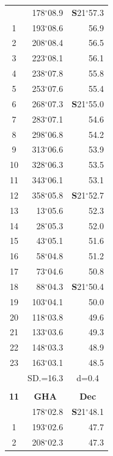 \documentclass[10pt, a4paper]{report}
\begin{document}
\begin{scriptsize}
\begin{tabular*}{0.2\textwidth}[t]{@{\extracolsep{\fill}}|c|rr|}
\hline\rule{0pt}{2.6ex}\noindent
0 & 178$^\circ$08.9 & \textbf{S}21$^\circ$57.3\\
1 & 193$^\circ$08.6 & 56.9\\
2 & 208$^\circ$08.4 & 56.5\\
3 & 223$^\circ$08.1 & \raisebox{0.24ex}{\boldmath$\cdot$~\boldmath$\cdot$~~}56.1\\
4 & 238$^\circ$07.8 & 55.8\\
5 & 253$^\circ$07.6 & 55.4\\[2Pt]
6 & 268$^\circ$07.3 & \textbf{S}21$^\circ$55.0\\
7 & 283$^\circ$07.1 & 54.6\\
8 & 298$^\circ$06.8 & 54.2\\
9 & 313$^\circ$06.6 & \raisebox{0.24ex}{\boldmath$\cdot$~\boldmath$\cdot$~~}53.9\\
10 & 328$^\circ$06.3 & 53.5\\
11 & 343$^\circ$06.1 & 53.1\\[2Pt]
12 & 358$^\circ$05.8 & \textbf{S}21$^\circ$52.7\\
13 & 13$^\circ$05.6 & 52.3\\
14 & 28$^\circ$05.3 & 52.0\\
15 & 43$^\circ$05.1 & \raisebox{0.24ex}{\boldmath$\cdot$~\boldmath$\cdot$~~}51.6\\
16 & 58$^\circ$04.8 & 51.2\\
17 & 73$^\circ$04.6 & 50.8\\[2Pt]
18 & 88$^\circ$04.3 & \textbf{S}21$^\circ$50.4\\
19 & 103$^\circ$04.1 & 50.0\\
20 & 118$^\circ$03.8 & 49.6\\
21 & 133$^\circ$03.6 & \raisebox{0.24ex}{\boldmath$\cdot$~\boldmath$\cdot$~~}49.3\\
22 & 148$^\circ$03.3 & 48.9\\
23 & 163$^\circ$03.1 & 48.5\\
\hline
\rule{0pt}{2.4ex} & \multicolumn{1}{c}{SD.=16.3} & \multicolumn{1}{c|}{d=0.4}\\
\hline
\multicolumn{1}{c}{}\\[-0.5ex]\hline
\multicolumn{1}{|c|}{\rule{0pt}{2.6ex}\textbf{11}} & \multicolumn{1}{c}{\textbf{GHA}} & \multicolumn{1}{c|}{\textbf{Dec}}\\
\hline\rule{0pt}{2.6ex}\noindent
0 & 178$^\circ$02.8 & \textbf{S}21$^\circ$48.1\\
1 & 193$^\circ$02.6 & 47.7\\
2 & 208$^\circ$02.3 & 47.3\\

\end{tabular*}
\end{scriptsize}
\end{document}
